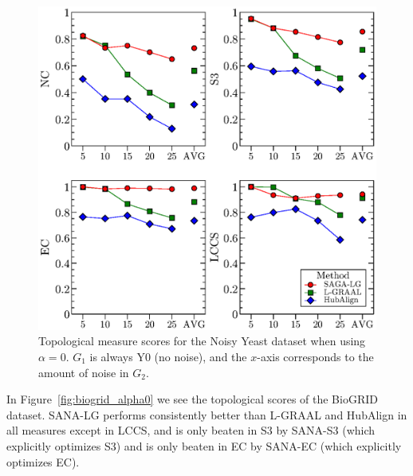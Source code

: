 \documentclass{bioinfo}
\begin{document}
\begin{figure}
\centering
\includegraphics[width=0.99\linewidth]{syntheticyeast_bw.eps}
\caption{Topological measure scores for the Noisy Yeast dataset when using $\alpha=0$. $G_1$ is always Y0 (no noise), and the $x$-axis corresponds to the amount of noise in $G_2$.}
\label{fig:syntheticyeast}
\end{figure}

In Figure~\ref{fig:biogrid_alpha0} we see the topological scores of the BioGRID dataset. SANA-LG performs consistently better than L-GRAAL and HubAlign in all measures except in LCCS, and is only beaten in S3 by SANA-S3 (which explicitly optimizes S3) and is only beaten in EC by SANA-EC (which explicitly optimizes EC).
\end{document}

